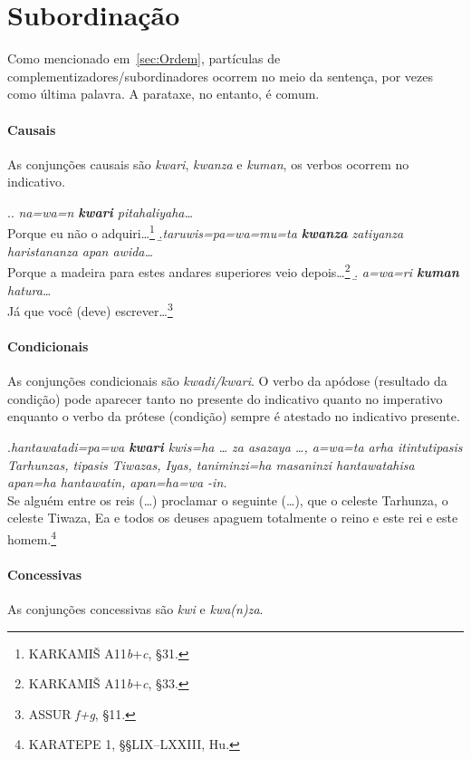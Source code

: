 \documentclass{luvita}
\begin{document}
\section{Subordinação}
Como mencionado em~\autoref{sec:Ordem}, partículas de
complementizadores\slash{}subor\-di\-na\-do\-res ocorrem no meio da sentença, por vezes
como última palavra.
A parataxe, no entanto, é comum.

\paragraph{Causais}
As conjunções causais são \emph{kwari}, \emph{kwanza} e \emph{kuman}, os verbos
ocorrem no indicativo.

\ex.\a. \emph{na=wa=n \textbf{kwari} pitahaliyaha\ldots{}}\\
Porque eu não o adquiri\ldots{}\footnote{KARKAMIŠ A11\emph{b}+\emph{c}, §31.}
\b.\emph{taruwis=pa=wa=mu=ta \textbf{kwanza} zatiyanza haristananza apan awida\ldots{}}\\
Porque a madeira para estes andares superiores veio
depois\ldots{}\footnote{KARKAMIŠ A11\emph{b}+\emph{c}, §33.}
\b. \emph{a=wa=ri \textbf{kuman} hatura\ldots{}}\\
Já que você (deve) escrever\ldots{}\footnote{ASSUR \emph{f+g}, §11.}



\paragraph{Condicionais}
As conjunções condicionais são \emph{kwadi\slash{}kwari}.
O verbo da apódose (resultado da condição) pode aparecer tanto no presente do
indicativo quanto no imperativo enquanto o verbo da prótese (condição) sempre é
atestado no indicativo presente.

\ex.\emph{hantawatadi=pa=wa \textbf{kwari} kwis=ha \ldots{} za asazaya \ldots{},
	a=wa=ta arha itintu\linebreak tipasis Tarhunzas, tipasis Tiwazas, Iyas,
	taniminzi=ha masaninzi hantawata\-hisa apan=ha hantawatin, apan=ha=wa
	-in.}\\
Se alguém entre os reis (\ldots{}) proclamar o seguinte (\ldots{}), que o celeste
Tarhun\-za,
o celeste Tiwaza, Ea e todos os deuses apaguem totalmente o reino e este rei e
este homem.\footnote{KARATEPE 1, §§LIX--LXXIII, Hu.}


\paragraph{Concessivas}
As conjunções concessivas são \emph{kwi} e \emph{kwa\emph{(}n\emph{)}za}.
\end{document}
